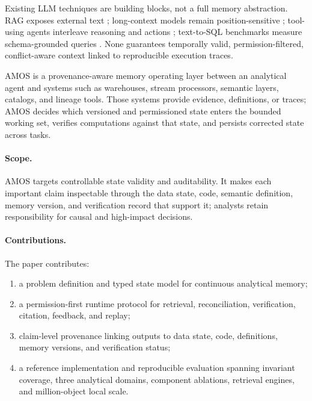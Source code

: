 \documentclass[sigconf,nonacm]{acmart}
\newcommand{\amos}{\textsc{AMOS}\xspace}
\begin{document}
Existing LLM techniques are building blocks, not a full memory abstraction. RAG exposes external text \cite{rag}; long-context models remain position-sensitive \cite{lostinthemiddle}; tool-using agents interleave reasoning and actions \cite{react,toolformer}; text-to-SQL benchmarks measure schema-grounded queries \cite{spider,bird,spider2}. None guarantees temporally valid, permission-filtered, conflict-aware context linked to reproducible execution traces.

\amos is a provenance-aware memory operating layer between an analytical agent and systems such as warehouses, stream processors, semantic layers, catalogs, and lineage tools. Those systems provide evidence, definitions, or traces; \amos decides which versioned and permissioned state enters the bounded working set, verifies computations against that state, and persists corrected state across tasks.

\paragraph{Scope.} \amos targets controllable state validity and auditability. It makes each important claim inspectable through the data state, code, semantic definition, memory version, and verification record that support it; analysts retain responsibility for causal and high-impact decisions.

\paragraph{Contributions.} The paper contributes:
\begin{enumerate}
    \item a problem definition and typed state model for continuous analytical memory;
    \item a permission-first runtime protocol for retrieval, reconciliation, verification, citation, feedback, and replay;
    \item claim-level provenance linking outputs to data state, code, definitions, memory versions, and verification status;
    \item a reference implementation and reproducible evaluation spanning invariant coverage, three analytical domains, component ablations, retrieval engines, and million-object local scale.
\end{enumerate}
\end{document}
